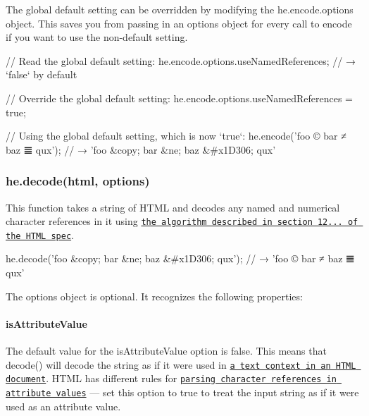 The global default setting can be overridden by modifying the {\ttfamily he.\+encode.\+options} object. This saves you from passing in an {\ttfamily options} object for every call to {\ttfamily encode} if you want to use the non-\/default setting.


\begin{DoxyCode}
// Read the global default setting:
he.encode.options.useNamedReferences;
// → `false` by default

// Override the global default setting:
he.encode.options.useNamedReferences = true;

// Using the global default setting, which is now `true`:
he.encode('foo © bar ≠ baz 𝌆 qux');
// → 'foo &copy; bar &ne; baz &#x1D306; qux'
\end{DoxyCode}


\subsubsection*{{\ttfamily he.\+decode(html, options)}}

This function takes a string of H\+T\+ML and decodes any named and numerical character references in it using \href{https://html.spec.whatwg.org/multipage/syntax.html#tokenizing-character-references}{\tt the algorithm described in section 12... of the H\+T\+ML spec}.


\begin{DoxyCode}
he.decode('foo &copy; bar &ne; baz &#x1D306; qux');
// → 'foo © bar ≠ baz 𝌆 qux'
\end{DoxyCode}


The {\ttfamily options} object is optional. It recognizes the following properties\+:

\paragraph*{{\ttfamily is\+Attribute\+Value}}

The default value for the {\ttfamily is\+Attribute\+Value} option is {\ttfamily false}. This means that {\ttfamily decode()} will decode the string as if it were used in \href{https://html.spec.whatwg.org/multipage/syntax.html#data-state}{\tt a text context in an H\+T\+ML document}. H\+T\+ML has different rules for \href{https://html.spec.whatwg.org/multipage/syntax.html#character-reference-in-attribute-value-state}{\tt parsing character references in attribute values} — set this option to {\ttfamily true} to treat the input string as if it were used as an attribute value.



